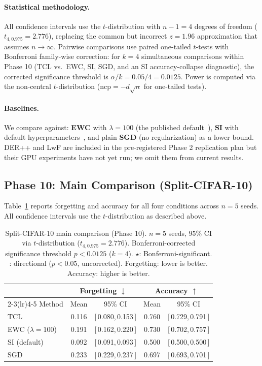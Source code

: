 \documentclass[10pt,letterpaper]{article}
\newcommand{\TCL}{\textsc{TCL}}
\newcommand{\EWC}{\textsc{EWC}}
\newcommand{\SI}{\textsc{SI}}
\newcommand{\SGD}{\textsc{SGD}}
\newcommand{\CI}[2]{[\,{#1},\,{#2}\,]}
\begin{document}
\paragraph{Statistical methodology.}
All confidence intervals use the $t$-distribution with $n{-}1{=}4$ degrees of
freedom ($t_{4,0.975} = 2.776$), replacing the common but incorrect $z = 1.96$
approximation that assumes $n \to \infty$.
Pairwise comparisons use paired one-tailed $t$-tests with Bonferroni family-wise
correction: for $k{=}4$ simultaneous comparisons within Phase 10
(TCL vs.\ EWC, SI, SGD, and an SI accuracy-collapse diagnostic),
the corrected significance threshold is $\alpha/k = 0.05/4 = 0.0125$.
Power is computed via the non-central $t$-distribution
($\mathrm{ncp} = -d\sqrt{n}$ for one-tailed tests).

\paragraph{Baselines.}
We compare against:
\textbf{\EWC{}} with $\lambda{=}100$ (the published default~\cite{Kirkpatrick2017}),
\textbf{\SI{}} with default hyperparameters~\cite{Zenke2017},
and plain \textbf{\SGD{}} (no regularization) as a lower bound.
DER++ and LwF are included in the pre-registered Phase 2 replication plan but
their GPU experiments have not yet run; we omit them from current results.

\subsection{Phase 10: Main Comparison (Split-CIFAR-10)}
\label{sec:phase10}

Table~\ref{tab:phase10} reports forgetting and accuracy for all four conditions
across $n{=}5$ seeds.
All confidence intervals use the $t$-distribution as described above.

\begin{table}[t]
  \caption{%
    Split-CIFAR-10 main comparison (Phase 10).
    $n{=}5$ seeds, $95\%$ CI via $t$-distribution ($t_{4,0.975}{=}2.776$).
    Bonferroni-corrected significance threshold $p < 0.0125$ ($k{=}4$).
    $\star$: Bonferroni-significant. \dag: directional ($p < 0.05$, uncorrected).
    Forgetting: lower is better. Accuracy: higher is better.
  }
  \label{tab:phase10}
  \centering
  \small
  \begin{tabular}{lcccc}
    \toprule
    & \multicolumn{2}{c}{Forgetting $\downarrow$} & \multicolumn{2}{c}{Accuracy $\uparrow$} \\
    \cmidrule(lr){2-3}\cmidrule(lr){4-5}
    Method & Mean & 95\% CI & Mean & 95\% CI \\
    \midrule
    \TCL{}             & 0.116 & \CI{0.080}{0.153} & 0.760 & \CI{0.729}{0.791} \\
    \EWC{} ($\lambda{=}100$) & 0.191 & \CI{0.162}{0.220} & 0.730 & \CI{0.702}{0.757} \\
    \SI{} (default)    & 0.092 & \CI{0.091}{0.093} & 0.500 & \CI{0.500}{0.500} \\
    \SGD{}             & 0.233 & \CI{0.229}{0.237} & 0.697 & \CI{0.693}{0.701} \\
    \bottomrule
  \end{tabular}
\end{table}
\end{document}
